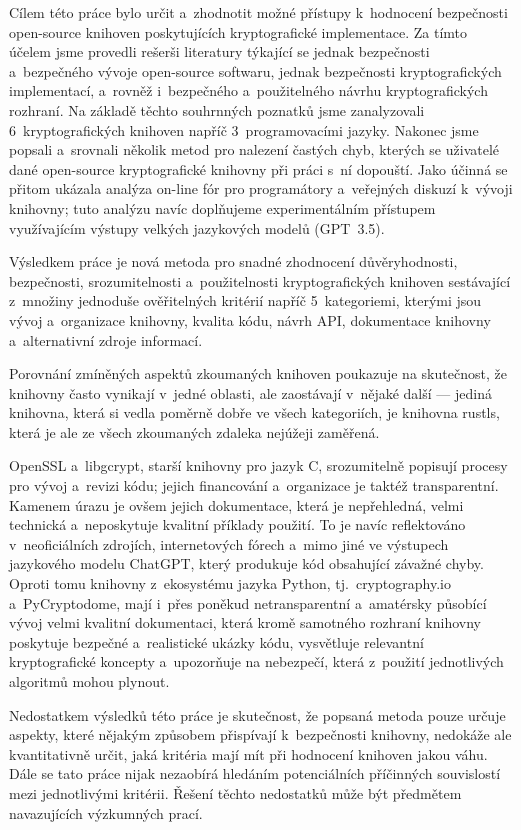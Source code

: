 \label{zaver}

Cílem této práce bylo určit a~zhodnotit možné přístupy k~hodnocení bezpečnosti open-source knihoven poskytujících kryptografické implementace. Za tímto účelem jsme provedli rešerši literatury týkající se jednak bezpečnosti a~bez\-peč\-né\-ho vývoje open-source softwaru, jednak bezpečnosti kryptografických implementací, a~rovněž i~bezpečného a~použitelného návrhu kryptografických rozhraní. Na základě těchto souhrnných poznatků jsme zanalyzovali 6~kryptografických knihoven napříč 3~programovacími jazyky. Nakonec jsme popsali a~srovnali několik metod pro nalezení častých chyb, kterých se uživatelé dané open-source kryptografické knihovny při práci s~ní dopouští. Jako účinná se přitom ukázala analýza on-line fór pro programátory a~veřejných diskuzí k~vývoji knihovny; tuto analýzu navíc doplňujeme experimentálním přístupem využívajícím výstupy velkých jazykových modelů (GPT~3.5).

Výsledkem práce je nová metoda pro snadné zhodnocení důvěryhodnosti, bezpečnosti, srozumitelnosti a~použitelnosti kryptografických knihoven sestávající z~množiny jednoduše ověřitelných kritérií napříč 5~kategoriemi, kterými jsou vývoj a~organizace knihovny, kvalita kódu, návrh API, dokumentace knihovny a~alternativní zdroje informací.

Porovnání zmíněných aspektů zkoumaných knihoven poukazuje na skutečnost, že knihovny často vynikají v~jedné oblasti, ale zaostávají v~nějaké další --- jediná knihovna, která si vedla poměrně dobře ve všech kategoriích, je knihovna rustls, která je ale ze všech zkoumaných zdaleka nejúžeji zaměřená.

OpenSSL a~libgcrypt, starší knihovny pro jazyk C, srozumitelně popisují procesy pro vývoj a~revizi kódu; jejich financování a~organizace je taktéž transparentní. Kamenem úrazu je ovšem jejich dokumentace, která je ne\-pře\-hled\-ná, velmi technická a~neposkytuje kvalitní příklady použití. To je navíc reflektováno v~neoficiálních zdrojích, internetových fórech a~mimo jiné ve výstupech jazykového modelu ChatGPT, který produkuje kód obsahující závažné chyby. Oproti tomu knihovny z~ekosystému jazyka Python, tj.~cryptography.io a~PyCryptodome, mají i~přes poněkud netransparentní a~amatérsky působící vývoj velmi kvalitní dokumentaci, která kromě samotného rozhraní knihovny poskytuje bezpečné a~realistické ukázky kódu, vysvětluje relevantní kryptografické koncepty a~upozorňuje na nebezpečí, která z~použití jednotlivých algoritmů mohou plynout.

Nedostatkem výsledků této práce je skutečnost, že popsaná metoda pouze určuje aspekty, které nějakým způsobem přispívají k~bezpečnosti knihovny, nedokáže ale kvantitativně určit, jaká kritéria mají mít při hodnocení knihoven jakou váhu. Dále se tato práce nijak nezaobírá hledáním potenciálních příčinných souvislostí mezi jednotlivými kritérii. Řešení těchto nedostatků může být předmětem navazujících výzkumných prací.

